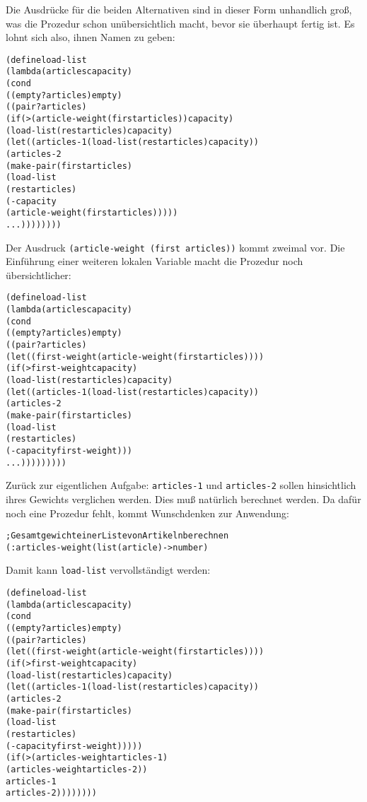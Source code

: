 %
Die Ausdrücke für die beiden Alternativen sind in dieser Form 
unhandlich groß, was die Prozedur schon unübersichtlich macht, bevor
sie überhaupt fertig ist.
Es lohnt sich also, ihnen Namen zu geben:
%
\begin{alltt}
(define load-list
  (lambda (articles capacity)
    (cond
     ((empty? articles) empty)
     ((pair? articles)
        (if (> (article-weight (first articles)) capacity)
            (load-list (rest articles) capacity)
            (let ((articles-1 (load-list (rest articles) capacity))
                  (articles-2
                    (make-pair (first articles)
                               (load-list
                                 (rest articles)
                                 (- capacity 
                                    (article-weight (first articles)))))
              ...))))))))
\end{alltt}
%
Der Ausdruck
\texttt{(article-weight (first articles))} kommt zweimal vor.  Die Einführung einer
weiteren lokalen Variable macht die Prozedur noch übersichtlicher:
%
\begin{alltt}
(define load-list
  (lambda (articles capacity)
    (cond
     ((empty? articles) empty)
     ((pair? articles)
      (let ((first-weight (article-weight (first articles))))
        (if (> first-weight capacity)
            (load-list (rest articles) capacity)
            (let ((articles-1 (load-list (rest articles) capacity))
                  (articles-2
                    (make-pair (first articles)
                               (load-list
                                 (rest articles)
                                 (- capacity first-weight)))
              ...)))))))))
\end{alltt}
%
Zurück zur eigentlichen Aufgabe: \texttt{articles-1} und
\texttt{articles-2} sollen hinsichtlich ihres Gewichts verglichen werden.
Dies muß natürlich berechnet werden.  Da dafür noch eine Prozedur
fehlt, kommt Wunschdenken zur Anwendung:
%
\begin{alltt}
; Gesamtgewicht einer Liste von Artikeln berechnen
(: articles-weight (list(article) -> number)
\end{alltt}
% 
Damit kann \texttt{load-list} vervollständigt werden:
%
\begin{alltt}
(define load-list
  (lambda (articles capacity)
    (cond
     ((empty? articles) empty)
     ((pair? articles)
      (let ((first-weight (article-weight (first articles))))
        (if (> first-weight capacity)
            (load-list (rest articles) capacity)
            (let ((articles-1 (load-list (rest articles) capacity))
                  (articles-2
                   (make-pair (first articles)
                              (load-list
                                (rest articles) 
                                (- capacity first-weight)))))
              (if (> (articles-weight articles-1)
                     (articles-weight articles-2))
                  articles-1
                  articles-2))))))))
\end{alltt}
